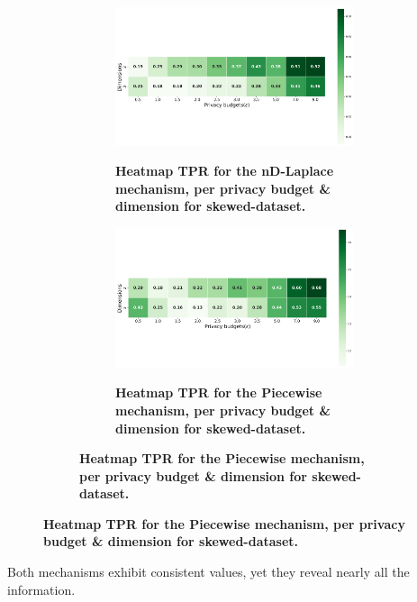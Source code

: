 \begin{figure}[H]
  \centering
  \begin{subfigure}[b]{0.9\textwidth}
    \begin{subfigure}[c]{1\textwidth}
      \caption{\textbf{Heatmap TPR for the nD-Laplace mechanism, per privacy budget \& dimension for skewed-dataset.}}
      \includegraphics[width=1\textwidth]{Results/nd-laplace/nd-Laplace/skewed-dataset/tpr.png}
      \label{fig:privacy_tpr_skewed-dataset_adversial_advantage_kd-laplace}
    \end{subfigure}
    \vfill %

    \begin{subfigure}[c]{1\textwidth}
      \caption{\textbf{Heatmap TPR for the Piecewise mechanism, per privacy budget \& dimension for skewed-dataset.}}
      \includegraphics[width=1\textwidth]{Results/nd-laplace/piecewise/skewed-dataset/tpr.png}
      \label{fig:privacy_tpr_skewed-dataset_adversial_advantage_piecewise}
    \end{subfigure}
  \end{subfigure}
\end{figure}
Both mechanisms exhibit consistent values, yet they reveal nearly all the information.

